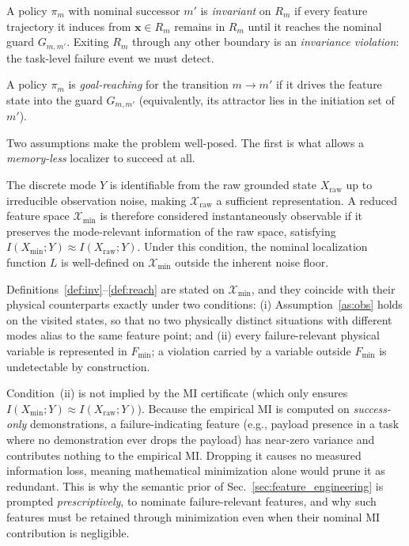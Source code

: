 \begin{definition}
\label{def:inv}
A policy $\pi_m$ with nominal successor $m'$ is \emph{invariant} on $R_m$ if every feature trajectory it induces from $\mathbf{x}\in R_m$ remains in $R_m$ until it reaches the nominal guard $G_{m,m'}$. Exiting $R_m$ through any other boundary is an \emph{invariance violation}: the task-level failure event we must detect.
\end{definition}

\begin{definition}
\label{def:reach}
A policy $\pi_m$ is \emph{goal-reaching} for the transition $m\!\to\!m'$ if it drives the feature state into the guard $G_{m,m'}$ (equivalently, its attractor lies in the initiation set of $m'$).
\end{definition}

Two assumptions make the problem well-posed. The first is what allows a \emph{memory-less} localizer to succeed at all.

\begin{assumption}
\label{as:obs}
The discrete mode $Y$ is identifiable from the raw grounded state $X_{\text{raw}}$ up to irreducible observation noise, making $\mathcal{X}_{\text{raw}}$ a sufficient representation. A reduced feature space $\mathcal{X}_{\min}$ is therefore considered instantaneously observable if it preserves the mode-relevant information of the raw space, satisfying $I(X_{\min}; Y) \approx I(X_{\text{raw}}; Y)$. Under this condition, the nominal localization function $L$ is well-defined on $\mathcal{X}_{\min}$ outside the inherent noise floor.
\end{assumption}


\begin{remark}
\label{rem:aliasing}
Definitions~\ref{def:inv}--\ref{def:reach} are stated on $\mathcal{X}_{\min}$, and they coincide with their physical counterparts exactly under two conditions: (i) Assumption~\ref{as:obs} holds on the visited states, so that no two physically distinct situations with different modes alias to the same feature point; and (ii) every failure-relevant physical variable is represented in $F_{\min}$; a violation carried by a variable outside $F_{\min}$ is undetectable by construction. 

Condition~(ii) is not implied by the MI certificate (which only ensures $I(X_{\min}; Y) \approx I(X_{\text{raw}}; Y)$). Because the empirical MI is computed on \emph{success-only} demonstrations, a failure-indicating feature (e.g., payload presence in a task where no demonstration ever drops the payload) has near-zero variance and contributes nothing to the empirical MI. Dropping it causes no measured information loss, meaning mathematical minimization alone would prune it as redundant. This is why the semantic prior of Sec.~\ref{sec:feature_engineering} is prompted \emph{prescriptively}, to nominate failure-relevant features, and why such features must be retained through minimization even when their nominal MI contribution is negligible.
\end{remark}

